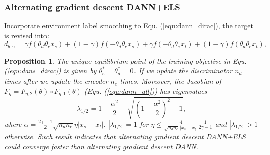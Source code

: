 \documentclass{article} \usepackage{iclr2023_conference,times}
\newtheorem{prop}{Proposition}
\newcommand{\abbr}[0]{DANN+ELS\xspace}
\newcommand{\myref}[1]{Equ. (\ref{#1})}
\begin{document}
\subsubsection{Alternating gradient descent \abbr}
Incorporate environment label smoothing to \myref{equ:dann_dirac}, the target is revised into:
\begin{equation}
d_{\theta,\gamma}= \gamma f(\theta_d\theta_e x_s)+(1-\gamma)f(-\theta_d\theta_e x_s)+ \gamma f(-\theta_d\theta_e x_t)+(1-\gamma) f(\theta_d\theta_e x_t),
\label{equ:dans_dirac}
\end{equation}
\begin{prop}
The unique equilibrium point of the training objective in \myref{equ:dans_dirac} is given by $\theta^*_e=\theta^*_d=0$. If we update the discriminator $n_d$ times after we update the encoder $n_e$ times. Moreover, the Jacobian of $F_\eta=F_{\eta,2}(\theta)\circ F_{\eta,1}(\theta)$ (\myref{equ:dann_alt}) has eigenvalues
\begin{equation}
  \lambda_{1/2}=1-\frac{\alpha^2}{2}\pm\sqrt{\left(1-\frac{\alpha^2}{2}\right)^2-1},
\end{equation}
where $\alpha=\frac{2\gamma-1}{2}\sqrt{n_dn_e}\eta|x_s-x_t|$. $|\lambda_{1/2}|=1$ for $\eta\leq\frac{4}{\sqrt{n_dn_e}|x_s-x_t|}\frac{1}{2\gamma-1}$ and $|\lambda_{1/2}|>1$ otherwise. Such result indicates that alternating gradient descent \abbr could converge faster than alternating gradient descent DANN. 
\label{prop:altdans}
\end{prop}
\end{document}
